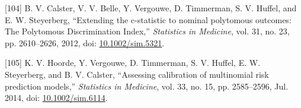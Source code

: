 \documentclass[12pt,PhD,twoside,openright]{muthesis}
\newenvironment{cslreferences}%
  {}%
  {\par}
\begin{document}
\begin{cslreferences}
\leavevmode\hypertarget{ref-calster_extending_2012-1}{}%
{[}104{]} B. V. Calster, V. V. Belle, Y. Vergouwe, D. Timmerman, S. V. Huffel, and E. W. Steyerberg, ``Extending the c-statistic to nominal polytomous outcomes: The Polytomous Discrimination Index,'' \emph{Statistics in Medicine}, vol. 31, no. 23, pp. 2610--2626, 2012, doi: \href{https://doi.org/10.1002/sim.5321}{10.1002/sim.5321}.

\leavevmode\hypertarget{ref-hoorde_assessing_2014}{}%
{[}105{]} K. V. Hoorde, Y. Vergouwe, D. Timmerman, S. V. Huffel, E. W. Steyerberg, and B. V. Calster, ``Assessing calibration of multinomial risk prediction models,'' \emph{Statistics in Medicine}, vol. 33, no. 15, pp. 2585--2596, Jul. 2014, doi: \href{https://doi.org/10.1002/sim.6114}{10.1002/sim.6114}.
\end{cslreferences}
\end{document}
